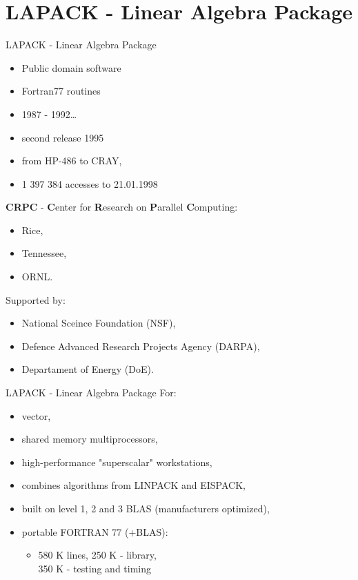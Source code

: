 \section{LAPACK - Linear Algebra Package}
	\begin{frame}{LAPACK - Linear Algebra Package}
		\begin{itemize}
			\item Public domain software
			\item Fortran77 routines
			\item 1987 - 1992\dots
			\item second release 1995
			\item from HP-486 to CRAY,
			\item 1 397 384 accesses to 21.01.1998
		\end{itemize}
		\textbf{CRPC} - \textbf{C}enter for \textbf{R}esearch on \textbf{P}arallel \textbf{C}omputing: 
		\begin{itemize}
			\item Rice,
			\item Tennessee,
			\item ORNL.
		\end{itemize}
		Supported by:
		\begin{itemize}
			\item National Sceince Foundation (NSF),
			\item Defence Advanced Research Projects Agency (DARPA),
			\item Departament of Energy (DoE).
		\end{itemize}
	\end{frame}
	\begin{frame}{LAPACK - Linear Algebra Package}
	For: \\ 
		\begin{itemize}
			\item vector,
			\item shared memory multiprocessors,
			\item high-performance "superscalar" workstations,
			\item combines algorithms from LINPACK and EISPACK,
			\item built on level 1, 2 and 3 BLAS (manufacturers optimized),
			\item portable FORTRAN 77 (+BLAS): 
			\begin{itemize}
				\item 580 K lines, 250 K - library, \\350 K - testing and timing
			\end{itemize}
		\end{itemize}
	\end{frame}
